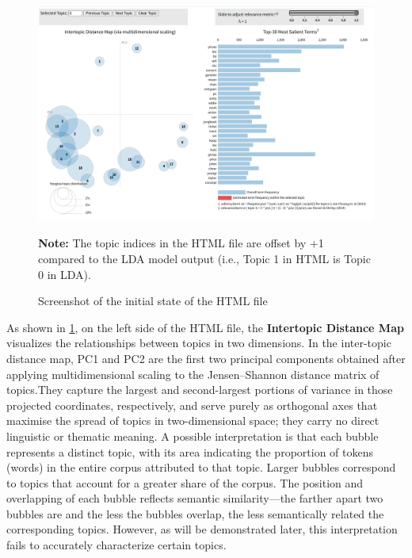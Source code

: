 \documentclass[12pt]{article}
\numberwithin{figure}{section}  %
\begin{document}
		\begin{figure}[H]
			\centering
			\includegraphics[width=1\textwidth]{Q2html0} 
			\caption{\centering Screenshot of the initial state of the HTML file}	
			\label{fig:HTML}	
			\vspace{-0.5em} %
    \parbox{\linewidth}{\small \textbf{Note:} The topic indices in the HTML file
	are offset by +1 compared to the LDA model output (i.e., Topic 1 in HTML is
	Topic 0 in LDA).}
		\end{figure}
	
	
	As shown in \cref{fig:HTML}, on the left side of the HTML file, the
	\textbf{Intertopic Distance Map} visualizes the relationships between topics
	in two dimensions. In the inter-topic distance map, PC1 and PC2 are the first two principal components obtained after applying multidimensional scaling to the Jensen–Shannon distance matrix of topics.They capture the largest and second-largest portions of variance in those projected coordinates, respectively, and serve purely as orthogonal axes that maximise the spread of topics in two-dimensional space; they carry no direct linguistic or thematic meaning. A possible interpretation is that each bubble represents 
	a distinct topic, with its area indicating the proportion of tokens (words)
	in the entire corpus attributed to that topic. Larger bubbles correspond to
	topics that account for a greater share of the corpus. The position and
	overlapping of each bubble reflects semantic similarity—the farther apart
	two bubbles are and the less the bubbles overlap, the less semantically %
	related the corresponding topics. However, as will be demonstrated later,
	this interpretation fails to accurately characterize certain topics.
	
\end{document}
